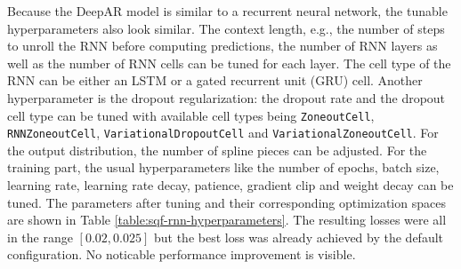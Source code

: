 Because the DeepAR model is similar to a recurrent neural network, 
the tunable hyperparameters also look similar. 
The context length, e.g., the number of steps to unroll the RNN 
before computing predictions, the number of RNN layers as well as the number of RNN cells 
can be tuned for each layer. 
The cell type of the RNN can be either an LSTM or a gated recurrent unit (GRU) cell.
Another hyperparameter is the dropout regularization: 
the dropout rate and the dropout cell type can be tuned 
with available cell types being \texttt{ZoneoutCell}, 
\texttt{RNNZoneoutCell}, \texttt{VariationalDropoutCell} 
and \texttt{VariationalZoneoutCell}.
For the output distribution, the number of spline pieces can be adjusted.
For the training part, the usual hyperparameters like the number of epochs, batch size, 
learning rate, learning rate decay, patience, gradient clip and weight decay can be tuned.
The parameters after tuning and their corresponding optimization spaces 
are shown in Table \ref{table:sqf-rnn-hyperparameters}.
The resulting losses were all in the range \([0.02, 0.025]\) but the best loss 
was already achieved by the default configuration. No noticable performance improvement is visible.


